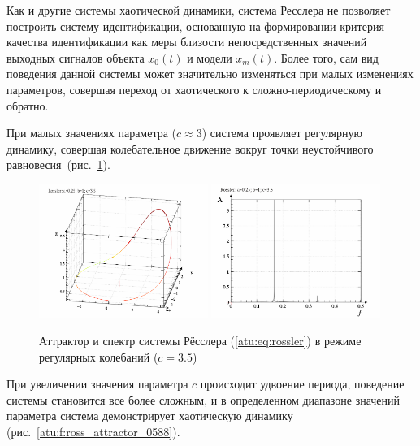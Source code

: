 Как и другие системы хаотической динамики, система Ресслера
не позволяет построить систему идентификации, основанную
на формировании критерия качества идентификации
как меры близости непосредственных значений выходных сигналов
объекта \( x_0(t) \) и модели \( x_m(t) \).
Более того, сам вид поведения данной системы может значительно изменяться
при малых изменениях параметров, совершая переход от
хаотического к сложно-периодическому и обратно.

При малых значениях параметра (\(c \approx 3 \))
система проявляет регулярную динамику,
совершая колебательное движение вокруг точки
неустойчивого равновесия~(рис.~\ref{atu:f:ross_attractor_0300}).

\begin{figure}[ht!]
\begin{center}
  \includegraphics[width=0.49\textwidth]{p/cha/ross/ross0-p_xyz_c=03x50.png}
  \hfill
  \includegraphics[width=0.49\textwidth]{p/cha/ross/ross_f-p_f_c=03x50.png}
\end{center}
  \caption{Аттрактор и спектр системы Рёсслера (\ref{atu:eq:rossler}) в режиме регулярных колебаний ($c=3.5$)}
\label{atu:f:ross_attractor_0300}
\end{figure}

При увеличении значения параметра \(c\) происходит удвоение периода,
поведение системы становится все более сложным, и в определенном
диапазоне значений параметра система демонстрирует
хаотическую динамику~\cite{atu_st67} (рис.~\ref{atu:f:ross_attractor_0588}).

